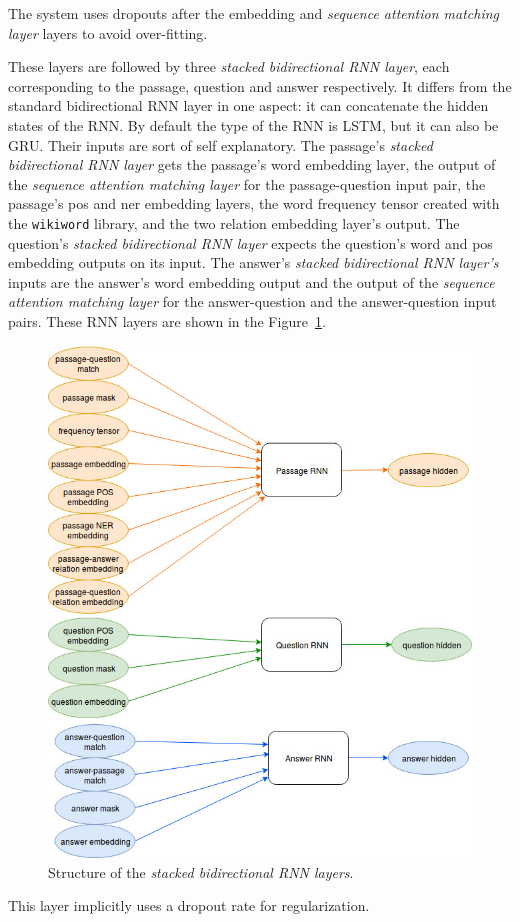 The system uses dropouts after the embedding and \textit{sequence attention matching layer} layers to avoid over-fitting.

These layers are followed by three \textit{stacked bidirectional RNN layer}, each corresponding to the passage, question and answer respectively. It differs from the standard bidirectional RNN layer in one aspect: it can concatenate the hidden states of the RNN. By default the type of the RNN is LSTM, but it can also be GRU. Their inputs are sort of self explanatory. The passage's \textit{stacked bidirectional RNN layer} gets the passage's word embedding layer, the output of the \textit{sequence attention matching layer} for the passage-question input pair, the passage's pos and ner embedding layers, the word frequency tensor created with the \texttt{wikiword} library, and the two relation embedding layer's output. The question's \textit{stacked bidirectional RNN layer} expects the question's word and pos embedding outputs on its input. The answer's \textit{stacked bidirectional RNN layer's} inputs are the answer's word embedding output and  the output of the \textit{sequence attention matching layer} for the answer-question and the answer-question input pairs. These RNN layers are shown in the Figure~\ref{fig:rnn}.
\begin{figure}[h]
	\centering
	\includegraphics[scale=0.35]{TriAN_rnn.jpg}
	\caption{Structure of the \textit{stacked bidirectional RNN layers}.}
	\label{fig:rnn}
\end{figure}
This layer implicitly uses a dropout rate for regularization.

